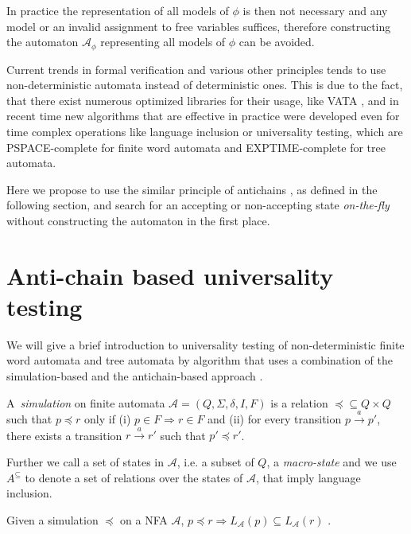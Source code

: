 In practice the representation of all models of $\phi$ is then not necessary and
any model or an invalid assignment to free variables suffices, therefore
constructing the automaton $\mathcal{A}_{\phi}$ representing all models of
$\phi$ can be avoided.

Current trends in formal verification and various other principles tends to use
non-deterministic automata instead of deterministic ones. This is due to the
fact, that there exist numerous optimized libraries for their usage, like VATA
\cite{vata}, and in recent time new algorithms that are effective in practice
were developed even for time complex operations like language inclusion or
universality testing, which are PSPACE-complete for finite word automata and
EXPTIME-complete for tree automata.

Here we propose to use the similar principle of antichains \cite{tacas}, as
defined in the following section, and search for an accepting or non-accepting
state \emph{on-the-fly} without constructing the automaton in the first place.

\section{Anti-chain based universality testing}

We will give a brief introduction to universality testing of non-deterministic
finite word automata and tree automata by algorithm that uses a combination of
the simulation-based and the antichain-based approach \cite{tacas}.

\begin{defz}
A~\emph{simulation} on finite automata $\mathcal{A} = (Q, \Sigma, \delta, I, F)$
 is a relation $\preceq \subseteq Q \times Q$ such that $p \preceq r$ only if
(i) $p \in F \Rightarrow r \in F$ and (ii) for every transition $p
\overset{a}{\longrightarrow} p'$, there exists a transition $r
\overset{a}{\longrightarrow} r'$ such that $p' \preceq r'$.
\end{defz}

Further we call a set of states in $\mathcal{A}$, i.e. a subset of $Q$, a
\emph{macro-state} and we use $A^{\subseteq}$ to denote a set of relations over
the states of $\mathcal{A}$, that imply language inclusion.

\begin{lemma}
Given a simulation $\preceq$ on a NFA $\mathcal{A}$, $p \preceq r \Rightarrow
L_\mathcal{A}(p) \subseteq L_\mathcal{A}(r)$ \cite{tacas}.
\end{lemma}


